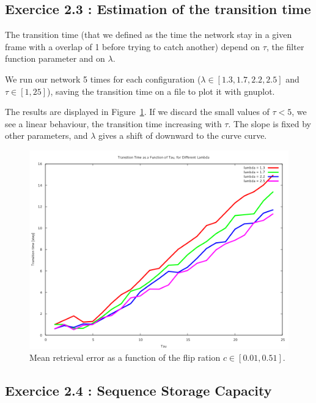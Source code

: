 \subsection{Exercice 2.3 : Estimation of the transition time}
The transition time (that we defined as the time the network stay in a given frame with a overlap of 1
before trying to catch another) depend on $\tau$, the filter function parameter and 
on $\lambda$.

We run our network 5 times for each configuration ($\lambda \in [1.3, 1.7, 2.2, 2.5]$ and 
$\tau \in [1, 25]$), saving the transition time on a file to plot it with gnuplot. 

The results
are displayed in Figure~\ref{transtime}. If we discard the small values of $\tau < 5$, we
see a linear behaviour, the transition time increasing with $\tau$. The slope is fixed by other parameters,
and $\lambda$ gives a shift of downward to the curve curve.

\begin{figure}\label{transtime}
    \begin{center}
    \caption{Mean retrieval error as a function of the flip ration $c\in[0.01, 0.51]$.  }
    \includegraphics[scale=0.5]{img/ex23.png}
    \end{center}
\end{figure}


\subsection{Exercice 2.4 : Sequence Storage Capacity}


